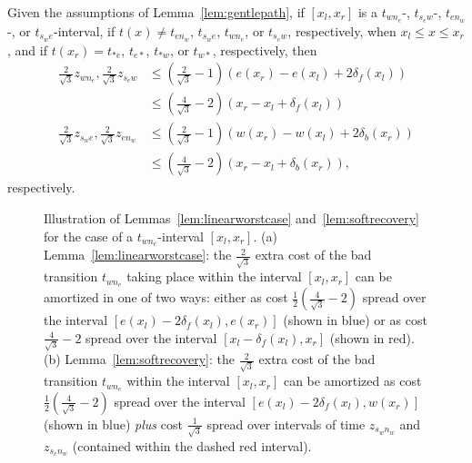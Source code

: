 \begin{lemma}  
\label{lem:linearworstcase}
Given the assumptions of Lemma~\ref{lem:gentlepath}, if $[x_l,x_r]$ is a 
$t_{wn_e}$-, $t_{s_ew}$-, $t_{en_w}$-, or $t_{s_we}$-interval, if
$t(x) \not= t_{en_w}$, $t_{s_we}$, $t_{wn_e}$, or $t_{s_ew}$, respectively, when
$x_l \leq x \leq x_r$, and if 
$t(x_r)=t_{\ast e}$, $t_{e \ast}$, $t_{\ast w}$, or $t_{w \ast}$, respectively, then
%
%
\begin{align}
\label{eq:LWC}
\frac{2}{\sqrt{3}}z_{wn_e}, \frac{2}{\sqrt{3}}z_{s_ew} & \leq \left(\frac{2}{\sqrt{3}}-1\right)(e(x_r)-e(x_l)+2\delta_f(x_l)) \\
\label{eq:LWC2}
& \leq \left(\frac{4}{\sqrt{3}}-2\right)(x_r-x_l+\delta_f(x_l)) \\
\frac{2}{\sqrt{3}}z_{s_we}, \frac{2}{\sqrt{3}}z_{en_w} & 
\leq \left(\frac{2}{\sqrt{3}}-1\right)(w(x_r)-w(x_l)+2\delta_b(x_r)) \nonumber \\ 
&  \leq \left(\frac{4}{\sqrt{3}}-2\right)(x_r-x_l+\delta_b(x_r)), \nonumber 
\end{align}
respectively.
\end{lemma}

\begin{figure}[!b]
\linearworstcase

\caption{Illustration of Lemmas~\ref{lem:linearworstcase}
and~\ref{lem:softrecovery} for the case of a
$t_{wn_e}$-interval $[x_l,x_r]$. (a) Lemma~\ref{lem:linearworstcase}: the
$\frac{2}{\sqrt{3}}$ extra cost of the bad transition $t_{wn_e}$ taking place
within the interval $[x_l,x_r]$ can be amortized in one of two ways:
either as cost $\frac{1}{2}(\frac{4}{\sqrt{3}}-2)$ spread over the interval
$[e(x_l)-2\delta_f(x_l),e(x_r)]$ (shown in blue) or as cost
$\frac{4}{\sqrt{3}}-2$ spread over the interval $[x_l-\delta_f(x_l),x_r]$
(shown in red).
(b) 
Lemma~\ref{lem:softrecovery}: the $\frac{2}{\sqrt{3}}$ extra cost of the
bad transition $t_{wn_e}$ within the interval $[x_l,x_r]$ can be amortized as
cost $\frac{1}{2}(\frac{4}{\sqrt{3}}-2)$ spread over the interval
$[e(x_l)-2\delta_f(x_l),w(x_r)]$ (shown in blue) {\em plus} cost
$\frac{1}{\sqrt{3}}$ spread over intervals of time $z_{s_wn_w}$ and $z_{s_en_w}$
(contained within the dashed red interval).}
\label{fig:linearworstcase}
\end{figure}



